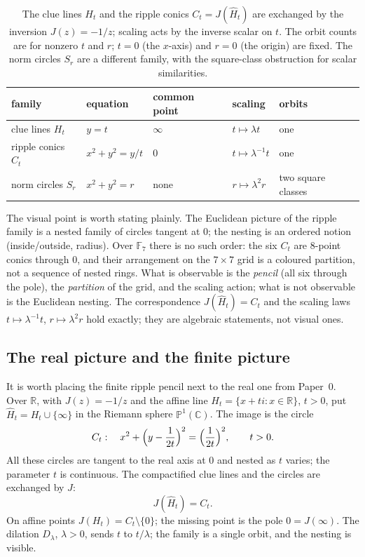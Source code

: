 \documentclass[11pt]{article}
\theoremstyle{definition}
\theoremstyle{remark}
\newcommand{\F}{\mathbb{F}}
\newcommand{\PP}{\mathbb{P}}
\newcommand{\R}{\mathbb{R}}
\newcommand{\C}{\mathbb{C}}
\begin{document}
\begin{table}[htbp]
\centering
\small
\begin{tabular}{@{}lllll@{}}
\toprule
family & equation & common point & scaling & orbits\\
\midrule
clue lines $H_t$ & $y=t$ & $\infty$ & $t\mapsto\lambda t$ & one\\
ripple conics $C_t$ & $x^2+y^2=y/t$ & $0$ & $t\mapsto\lambda^{-1}t$ & one\\
norm circles $S_r$ & $x^2+y^2=r$ & none & $r\mapsto\lambda^2r$ & two square classes\\
\bottomrule
\end{tabular}
\caption{The clue lines $H_t$ and the ripple conics $C_t=J(\widehat H_t)$ are exchanged by
the inversion $J(z)=-1/z$; scaling acts by the inverse scalar on $t$.  The
orbit counts are for nonzero $t$ and $r$; $t=0$ (the $x$-axis) and $r=0$ (the
origin) are fixed.  The norm circles $S_r$ are a different family, with the
square-class obstruction for scalar similarities.}
\label{tab:ripple}
\end{table}

The visual point is worth stating plainly.  The Euclidean picture of the ripple
family is a nested family of circles tangent at $0$; the nesting is an ordered
notion (inside/outside, radius).  Over $\F_7$ there is no such order: the six
$C_t$ are $8$-point conics through $0$, and their arrangement on the $7\times7$
grid is a coloured partition, not a sequence of nested rings.  What is
observable is the \emph{pencil} (all six through the pole), the \emph{partition}
of the grid, and the scaling action; what is not observable is the Euclidean
nesting.  The correspondence $J(\widehat H_t)=C_t$ and the scaling laws
$t\mapsto\lambda^{-1}t$, $r\mapsto\lambda^2r$ hold exactly; they are algebraic
statements, not visual ones.

\subsection{The real picture and the finite picture}
\label{subsec:real-finite}

It is worth placing the finite ripple pencil next to the real one from
Paper~0.  Over $\R$, with $J(z)=-1/z$ and the affine line
$H_t=\{x+ti:x\in\R\}$, $t>0$, put $\widehat H_t=H_t\cup\{\infty\}$ in the
Riemann sphere $\PP^1(\C)$.  The image is the circle
\[
  C_t:\quad x^2+\Bigl(y-\frac1{2t}\Bigr)^2=\Bigl(\frac1{2t}\Bigr)^2,
  \qquad t>0 .
\]
All these circles are tangent to the real axis at $0$ and nested as $t$ varies;
the parameter $t$ is continuous.  The compactified clue lines and the circles
are exchanged by $J$:
\[
  J(\widehat H_t)=C_t .
\]
On affine points $J(H_t)=C_t\setminus\{0\}$; the missing point is the pole
$0=J(\infty)$.  The dilation $D_\lambda$, $\lambda>0$, sends $t$ to
$t/\lambda$; the family is a single orbit, and the nesting is visible.
\end{document}
